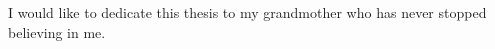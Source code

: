 
\begin{dedication} 

I would like to dedicate this thesis to my grandmother who has never stopped believing in me.

\end{dedication}

